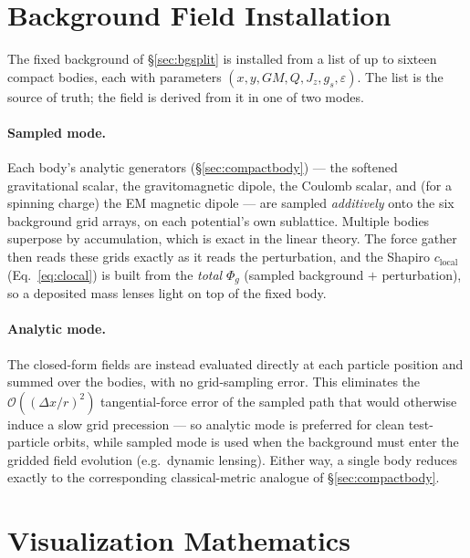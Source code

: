 \documentclass[11pt]{article}
\newcommand{\Phig}{\Phi_g}                 %
\newcommand{\dx}{\Delta x}                 %
\newcommand{\order}[1]{\mathcal{O}(#1)}    %
\newcommand{\clocal}{c_{\mathrm{local}}}
\begin{document}
\section{Background Field Installation}
\label{sec:bgimpl}

The fixed background of \S\ref{sec:bgsplit} is installed from a list of up to
sixteen compact bodies, each with parameters $(x,y,GM,Q,J_z,g_s,\varepsilon)$.
The list is the source of truth; the field is derived from it in one of two
modes.

\paragraph{Sampled mode.} Each body's analytic generators
(\S\ref{sec:compactbody}) --- the softened gravitational scalar, the
gravitomagnetic dipole, the Coulomb scalar, and (for a spinning charge) the EM
magnetic dipole --- are sampled \emph{additively} onto the six background grid
arrays, on each potential's own sublattice. Multiple bodies superpose by
accumulation, which is exact in the linear theory. The force gather then reads
these grids exactly as it reads the perturbation, and the Shapiro $\clocal$
(Eq.~\eqref{eq:clocal}) is built from the \emph{total} $\Phig$ (sampled
background $+$ perturbation), so a deposited mass lenses light on top of the
fixed body.

\paragraph{Analytic mode.} The closed-form fields are instead evaluated directly
at each particle position and summed over the bodies, with no grid-sampling
error. This eliminates the $\order{(\dx/r)^2}$ tangential-force error of the
sampled path that would otherwise induce a slow grid precession --- so analytic
mode is preferred for clean test-particle orbits, while sampled mode is used when
the background must enter the gridded field evolution (e.g.\ dynamic lensing).
Either way, a single body reduces exactly to the corresponding classical-metric
analogue of \S\ref{sec:compactbody}.

\section{Visualization Mathematics}
\label{sec:viz}
\end{document}
